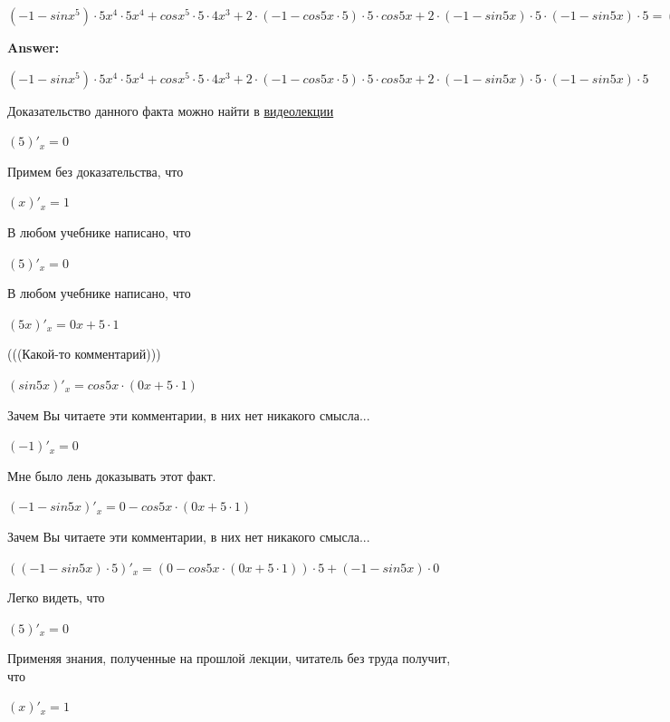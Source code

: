 \documentclass[12pt,a4paper,fleqn]{article}
\theoremstyle{definition}
\begin{document}
$( -1  - sin{ x }^{ 5 }) \cdot  5 { x }^{ 4 } \cdot  5 { x }^{ 4 } + cos{ x }^{ 5 } \cdot  5  \cdot  4 { x }^{ 3 } +  2  \cdot ( -1  - cos 5  x  \cdot  5 ) \cdot  5  \cdot cos 5  x  +  2  \cdot ( -1  - sin 5  x ) \cdot  5  \cdot ( -1  - sin 5  x ) \cdot  5  = ( -1  - sin{ x }^{ 5 }) \cdot  5 { x }^{ 4 } \cdot  5 { x }^{ 4 } + cos{ x }^{ 5 } \cdot  5  \cdot  4 { x }^{ 3 } +  2  \cdot ( -1  - cos 5  x  \cdot  5 ) \cdot  5  \cdot cos 5  x  +  2  \cdot ( -1  - sin 5  x ) \cdot  5  \cdot ( -1  - sin 5  x ) \cdot  5 $


\textbf{Answer:}

$( -1  - sin{ x }^{ 5 }) \cdot  5 { x }^{ 4 } \cdot  5 { x }^{ 4 } + cos{ x }^{ 5 } \cdot  5  \cdot  4 { x }^{ 3 } +  2  \cdot ( -1  - cos 5  x  \cdot  5 ) \cdot  5  \cdot cos 5  x  +  2  \cdot ( -1  - sin 5  x ) \cdot  5  \cdot ( -1  - sin 5  x ) \cdot  5 $

Доказательство данного факта можно найти в \href{https://www.youtube.com/watch?v=dQw4w9WgXcQ}{видеолекции} 

$( 5 )'_{x} =  0 $

Примем без доказательства, что 

$( x )'_{x} =  1 $

В любом учебнике написано, что 

$( 5 )'_{x} =  0 $

В любом учебнике написано, что 

$( 5  x )'_{x} =  0  x  +  5  \cdot  1 $

(((Какой-то комментарий))) 

$(sin 5  x )'_{x} = cos 5  x  \cdot ( 0  x  +  5  \cdot  1 )$

Зачем Вы читаете эти комментарии, в них нет никакого смысла... 

$( -1 )'_{x} =  0 $

Мне было лень доказывать этот факт.

$( -1  - sin 5  x )'_{x} =  0  - cos 5  x  \cdot ( 0  x  +  5  \cdot  1 )$

Зачем Вы читаете эти комментарии, в них нет никакого смысла... 

$(( -1  - sin 5  x ) \cdot  5 )'_{x} = ( 0  - cos 5  x  \cdot ( 0  x  +  5  \cdot  1 )) \cdot  5  + ( -1  - sin 5  x ) \cdot  0 $

Легко видеть, что 

$( 5 )'_{x} =  0 $

Применяя знания, полученные на прошлой лекции, читатель без труда получит, что 

$( x )'_{x} =  1 $
\end{document}
